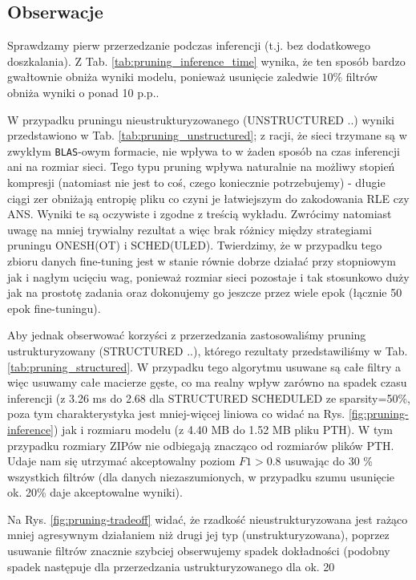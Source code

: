 \documentclass[12pt,twocolumn]{article}
\begin{document}
\subsection{Obserwacje}

Sprawdzamy pierw przerzedzanie podczas inferencji (t.j. bez dodatkowego doszkalania). Z Tab. \ref{tab:pruning_inference_time} wynika, że ten sposób bardzo gwałtownie obniża wyniki modelu, ponieważ usunięcie zaledwie $10\%$ filtrów obniża wyniki o ponad 10 p.p..

W przypadku pruningu nieustrukturyzowanego (UNSTRUCTURED ..) wyniki przedstawiono w Tab. \ref{tab:pruning_unstructured}; z racji, że sieci trzymane są w zwykłym \texttt{BLAS}-owym formacie, nie wpływa to
w żaden sposób na czas inferencji ani na rozmiar sieci. Tego typu pruning wpływa naturalnie na możliwy stopień kompresji (natomiast nie jest to
coś, czego koniecznie potrzebujemy) - długie ciągi zer obniżają entropię pliku co czyni je łatwiejszym do zakodowania RLE czy ANS.
Wyniki te są oczywiste i zgodne z treścią wykładu. Zwrócimy natomiast uwagę na mniej trywialny rezultat a więc brak różnicy między strategiami pruningu ONESH(OT) i SCHED(ULED).
Twierdzimy, że w przypadku tego zbioru danych fine-tuning jest w stanie równie dobrze działać przy stopniowym jak i nagłym ucięciu wag, ponieważ rozmiar sieci
pozostaje i tak stosunkowo duży jak na prostotę zadania oraz dokonujemy go jeszcze przez wiele epok (łącznie 50 epok fine-tuningu).

Aby jednak obserwować korzyści z przerzedzania zastosowaliśmy pruning ustrukturyzowany (STRUCTURED ..),
którego rezultaty przedstawiliśmy w Tab. \ref{tab:pruning_structured}.
W przypadku tego algorytmu usuwane są całe filtry a więc usuwamy całe macierze gęste, co ma realny wpływ zarówno na spadek czasu inferencji (z 3.26 ms do 2.68 dla STRUCTURED SCHEDULED ze sparsity=50\%, poza tym charakterystyka jest mniej-więcej liniowa co widać na Rys. \ref{fig:pruning-inference}) jak i rozmiaru modelu (z 4.40 MB do 1.52 MB pliku PTH). W tym przypadku
rozmiary ZIPów nie odbiegają znacząco od rozmiarów plików PTH. Udaje nam się utrzymać akceptowalny poziom $F1 > 0.8$ usuwając do 30 \% wszystkich filtrów (dla danych niezaszumionych, w przypadku szumu usunięcie ok. 20\% daje akceptowalne wyniki).

Na Rys. \ref{fig:pruning-tradeoff} widać, że rzadkość nieustrukturyzowana jest rażąco mniej agresywnym działaniem niż drugi jej typ (unstrukturyzowana), poprzez usuwanie filtrów znacznie szybciej obserwujemy spadek dokładności (podobny spadek następuje dla przerzedzania ustrukturyzowanego dla ok. 20%
\end{document}
